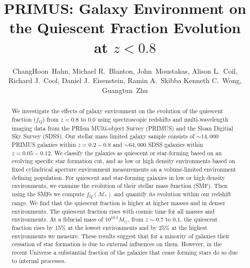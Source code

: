 \documentclass{aastex}
\begin{document}
\title{PRIMUS: Galaxy Environment on the Quiescent Fraction Evolution at $z < 0.8$}
\author{
ChangHoon~Hahn, 
Michael R.~Blanton, 
John~Moustakas,
Alison L.~Coil, 
Richard J.~Cool, 
Daniel J.~Eisenstein,
Ramin A.~Skibba
Kenneth C.~Wong, 
Guangtun~Zhu
}
\begin{abstract}
We investigate the effects of galaxy environment on the evolution of
the quiescent fraction ($f_{\mathrm{Q}}$) from $z =0.8 $ to $ 0.0$ using
spectroscopic redshifts and multi-wavelength imaging data from the
PRIsm MUlti-object Survey (PRIMUS) and the Sloan Digitial Sky Survey
(SDSS). Our stellar mass limited galaxy sample consists of $\sim
14,000$ PRIMUS galaxies within $z = 0.2-0.8$ and $\sim 64,000$ SDSS
galaxies within $z = 0.05-0.12$. We classify the galaxies as quiescent
or star-forming based on an evolving specific star formation cut, and
as low or high density environments based on fixed cylindrical
aperture environment measurements on a volume-limited environment
defining population. For quiescent and
star-forming galaxies in low or high density environments, we examine
the evolution of their stellar mass function (SMF). Then using the
SMFs we compute $f_{\mathrm{Q}}(\mathcal{M}_{*})$ and quantify its
evolution within our redshift range. We find that the quiescent
fraction is higher at higher masses and in denser environments. The
quiescent fraction rises with cosmic time for all masses and
environments. At a fiducial mass of $10^{10.5}M_\odot$, from $z\sim
0.7$ to $0.1$, the quiescent fraction rises by $15\%$ at the
lowest environments and by $25\%$ at the highest environments we measure.
These results suggest that for a minority of galaxies their cessation
of star formation is due to external influences on
them. However, in the recent Universe a substantial fraction of the
galaxies that cease forming stars do so due to internal processes.
\end{abstract}
\end{document}
